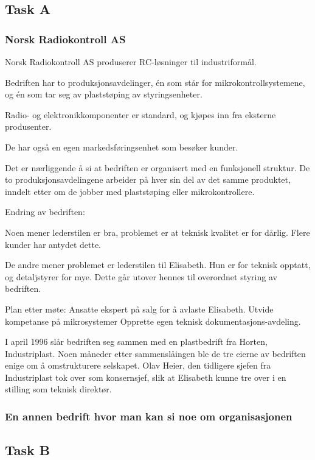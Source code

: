 
\subsection{Task A}

\subsubsection{Norsk Radiokontroll AS}


Norsk Radiokontroll AS produserer RC-løsninger til industriformål.

Bedriften har to produksjonsavdelinger, én som står for mikrokontrollsystemene, og én som tar seg av plaststøping av styringsenheter.

Radio- og elektronikkomponenter er standard, og kjøpes inn fra eksterne produsenter.

De har også en egen markedsføringsenhet som besøker kunder.

Det er nærliggende å si at bedriften er organisert med en funksjonell struktur.
De to produksjonsavdelingene arbeider på hver sin del av det samme produktet, inndelt etter om de jobber med plaststøping eller mikrokontrollere.

Endring av bedriften:

Noen mener lederstilen er bra, problemet er at teknisk kvalitet er for dårlig.
Flere kunder har antydet dette.

De andre mener problemet er lederstilen til Elisabeth.
Hun er for teknisk opptatt, og detaljstyrer for mye.
Dette går utover hennes til overordnet styring av bedriften.

Plan etter møte:
Ansatte ekspert på salg for å avlaste Elisabeth.
Utvide kompetanse på mikrosystemer
Opprette egen teknisk dokumentasjons-avdeling.

I april 1996 slår bedriften seg sammen med en plastbedrift fra Horten, Industriplast.
Noen måneder etter sammenslåingen ble de tre eierne av bedriften enige om å omstrukturere selskapet. Olav Heier, den tidligere sjefen fra Industriplast tok over som konsernsjef, slik at Elisabeth kunne tre over i en stilling som teknisk direktør.


\subsubsection{En annen bedrift hvor man kan si noe om organisasjonen}

\subsection{Task B}

